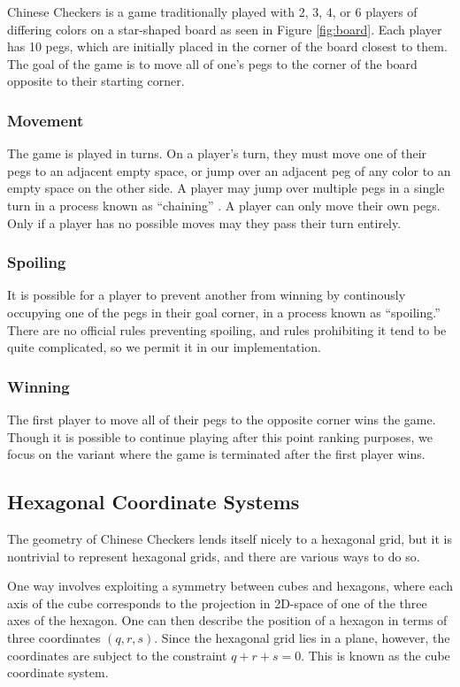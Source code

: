 \documentclass[12pt, a4paper, twocolumn]{article}
\begin{document}
Chinese Checkers is a game traditionally played with 2, 3, 4, or 6 players of differing colors on a star-shaped board as seen in Figure \ref{fig:board}. Each player has 10 pegs, which are initially placed in the corner of the board closest to them. The goal of the game is to move all of one's pegs to the corner of the board opposite to their starting corner.

\subsubsection{Movement}
The game is played in turns. On a player's turn, they must move one of their pegs to an adjacent empty space, or jump over an adjacent peg of any color to an empty space on the other side. A player may jump over multiple pegs in a single turn in a process known as ``chaining'' \cite{ChainingJumps}. A player can only move their own pegs. Only if a player has no possible moves may they pass their turn entirely.

\subsubsection{Spoiling}
It is possible for a player to prevent another from winning by continously occupying one of the pegs in their goal corner, in a process known as ``spoiling.'' \cite{ChineseCheckersSpoiling} There are no official rules preventing spoiling, and rules prohibiting it tend to be quite complicated, so we permit it in our implementation.

\subsubsection{Winning}
The first player to move all of their pegs to the opposite corner wins the game. Though it is possible to continue playing after this point ranking purposes, we focus on the variant where the game is terminated after the first player wins.

\subsection{Hexagonal Coordinate Systems}

The geometry of Chinese Checkers lends itself nicely to a hexagonal grid, but it is nontrivial to represent hexagonal grids, and there are various ways to do so. \cite{HexagonalCoordinates}

One way involves exploiting a symmetry between cubes and hexagons, where each axis of the cube corresponds to the projection in 2D-space of one of the three axes of the hexagon. One can then describe the position of a hexagon in terms of three coordinates $(q, r, s)$. Since the hexagonal grid lies in a plane, however, the coordinates are subject to the constraint $q + r + s = 0$. This is known as the cube coordinate system.
\end{document}
